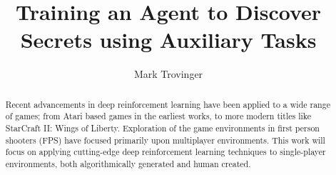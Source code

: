 \documentclass[11pt]{article}
\title{Training an Agent to Discover Secrets using Auxiliary Tasks}
\author{Mark Trovinger}
\begin{document}
\newpage
\begin{abstract}
	Recent advancements in deep reinforcement learning have been applied to a wide range of
	games; from Atari based games in the earliest works, to more modern titles like StarCraft II:
	Wings of Liberty. Exploration of the game environments in first person shooters (FPS) have
	focused primarily upon multiplayer environments. This work will focus on applying cutting-edge 
	deep reinforcement learning techniques to single-player environments, both algorithmically generated and	
	human created.
	
\end{abstract}
\end{document}

